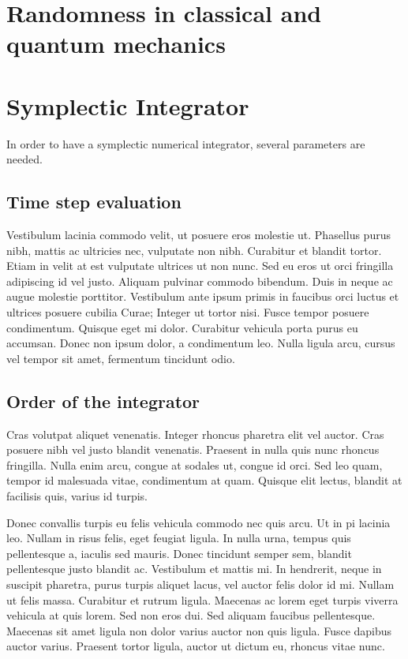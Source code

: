 \section{Randomness in classical and quantum mechanics}


\section{Symplectic Integrator}
In order to have a symplectic numerical integrator, several parameters are needed.

\subsection{Time step evaluation}

Vestibulum lacinia commodo velit, ut posuere eros molestie ut. Phasellus purus nibh, mattis ac ultricies nec, vulputate non nibh. Curabitur et blandit tortor. Etiam in velit at est vulputate ultrices ut non nunc. Sed eu eros ut orci fringilla adipiscing id vel justo. Aliquam pulvinar commodo bibendum. Duis in neque ac augue molestie porttitor. Vestibulum ante ipsum primis in faucibus orci luctus et ultrices posuere cubilia Curae; Integer ut tortor nisi. Fusce tempor posuere condimentum. Quisque eget mi dolor. Curabitur vehicula porta purus eu accumsan. Donec non ipsum dolor, a condimentum leo. Nulla ligula arcu, cursus vel tempor sit amet, fermentum tincidunt odio.

\subsection{Order of the integrator}

Cras volutpat aliquet venenatis. Integer rhoncus pharetra elit vel auctor. Cras posuere nibh vel justo blandit venenatis. Praesent in nulla quis nunc rhoncus fringilla. Nulla enim arcu, congue at sodales ut, congue id orci. Sed leo quam, tempor id malesuada vitae, condimentum at quam. Quisque elit lectus, blandit at facilisis quis, varius id turpis.

Donec convallis turpis eu felis vehicula commodo nec quis arcu. Ut in \gls{pi} lacinia leo. Nullam in risus felis, eget feugiat ligula. In nulla urna, tempus quis pellentesque a, iaculis sed mauris. Donec tincidunt semper sem, blandit pellentesque justo blandit ac. Vestibulum et mattis mi. In hendrerit, neque in suscipit pharetra, purus turpis aliquet lacus, vel auctor felis dolor id mi. Nullam ut felis massa. Curabitur et rutrum ligula. Maecenas ac lorem eget turpis viverra vehicula at quis lorem. Sed non eros dui. Sed aliquam faucibus pellentesque. Maecenas sit amet ligula non dolor varius auctor non quis ligula. Fusce dapibus auctor varius. Praesent tortor ligula, auctor ut dictum eu, rhoncus vitae nunc.

